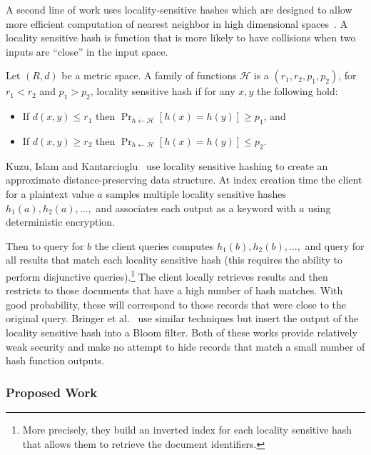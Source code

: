 A second line of work uses locality-sensitive hashes which are designed to allow more efficient computation of nearest neighbor in high dimensional spaces~\cite{datar2004locality,slaney2008locality}.  A locality sensitive hash is function that is more likely to have collisions when two inputs are ``close'' in the input space.  \begin{definition}
Let $(R,d)$ be a metric space.  A family of functions $\mathcal{H}$ is a $(r_1, r_2, p_1, p_2)$, for $r_1< r_2$ and $p_1 >p_2$, locality sensitive hash if for any $x, y$ the following hold:
\begin{itemize}
\item If $d(x, y) \le r_1$ then $\Pr_{h\leftarrow \mathcal{H}}[h(x) = h(y)] \ge p_1$, and 
\item If $d(x, y) \ge r_2$ then $\Pr_{h\leftarrow \mathcal{H}}[h(x) = h(y)] \le p_2$.
\end{itemize}
\end{definition}
 
Kuzu, Islam and Kantarcioglu~\cite{kuzu2012efficient} use locality sensitive hashing to create an approximate distance-preserving data structure.  At index creation time the client for a plaintext value $a$ samples multiple locality sensitive hashes $h_1(a), h_2(a),...,$ and associates each output as a keyword with $a$ using deterministic encryption.

Then to query for $b$ the client queries computes $h_1(b), h_2(b),...,$ and query for all results that match each locality sensitive hash (this requires the ability to perform disjunctive queries).\footnote{More precisely, they build an inverted index for each locality sensitive hash that allows them to retrieve the document identifiers.}  The client locally retrieves results and then restricts to those documents that have a high number of hash matches.  With good probability, these will correspond to those records that were close to the original query.  Bringer et al.~\cite{bringer2011identification,bringer2009error} use similar techniques but insert the output of the locality sensitive hash into a Bloom filter.  Both of these works provide relatively weak security and make no attempt to hide records that match a small number of hash function outputs.  

\subsubsection{Proposed Work}
